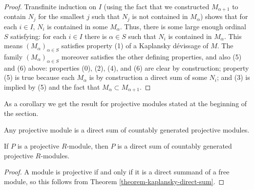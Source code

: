 \begin{proof}
\medskip\noindent
Transfinite induction on $I$ (using the fact that we constructed
$M_{\alpha + 1}$
to contain $N_j$ for the smallest $j$ such that $N_j$ is not contained in
$M_{\alpha}$) shows that for each $i \in I$, $N_i$ is contained in some
$M_{\alpha}$.  Thus, there is some large enough ordinal $S$ satisfying: for
each $i \in I$ there is $\alpha \in S$ such that $N_i$ is contained in
$M_{\alpha}$.  This means $(M_{\alpha})_{\alpha \in S}$ satisfies property (1)
of a Kaplansky d\'evissage of $M$.  The family $(M_{\alpha})_{\alpha \in S}$
moreover satisfies the other defining properties, and also (5) and (6) above:
properties (0), (2), (4), and (6) are clear by construction;  property (5) is
true because each $M_{\alpha}$ is by construction a direct sum of some $N_i$;
and (3) is implied by (5) and the fact that $M_{\alpha} \subset M_{\alpha + 1}$.
\end{proof}

\noindent
As a corollary we get the result for projective modules stated at the beginning
of the section.

\begin{theorem}
\label{theorem-projective-direct-sum}
\begin{slogan}
Any projective module is a direct sum of countably generated
projective modules.
\end{slogan}
If $P$ is a projective $R$-module, then $P$ is a direct sum of countably
generated projective $R$-modules.
\end{theorem}

\begin{proof}
A module is projective if and only if it is a direct summand of a free module,
so this follows from Theorem \ref{theorem-kaplansky-direct-sum}.
\end{proof}



